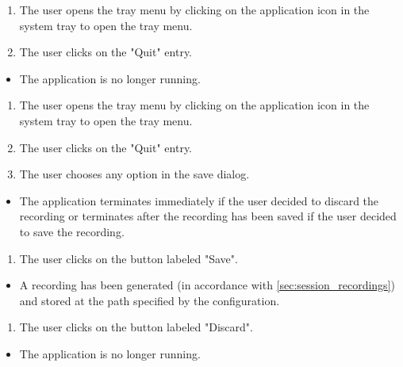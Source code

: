 \begin{tests}
    {\begin{enumerate}
        \item The \gls{user} opens the tray menu by clicking on the application icon in the system tray to open the tray menu.
        \item The \gls{user} clicks on the "Quit" entry.
    \end{enumerate}}
    {\begin{itemize}
        \item The application is no longer running.
    \end{itemize}}

    {\begin{enumerate}
        \item The \gls{user} opens the tray menu by clicking on the application icon in the system tray to open the tray menu.
        \item The \gls{user} clicks on the "Quit" entry.
        \item The \gls{user} chooses any option in the save dialog.
    \end{enumerate}}
    {\begin{itemize}
        \item The application terminates immediately if the \gls{user} decided to discard the recording or terminates after the recording has been saved if the \gls{user} decided to save the recording.
    \end{itemize}}
        
    {\begin{enumerate}
        \item The \gls{user} clicks on the button labeled "Save".
    \end{enumerate}}
    {\begin{itemize}
        \item A recording has been generated (in accordance with \ref{sec:session_recordings}) and stored at the path specified by the configuration.
    \end{itemize}}

    {\begin{enumerate}
        \item The \gls{user} clicks on the button labeled "Discard".
    \end{enumerate}}
    {\begin{itemize}
        \item The application is no longer running.
    \end{itemize}}


\end{tests}
